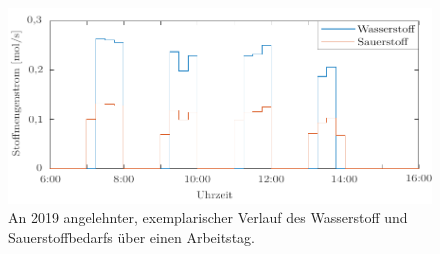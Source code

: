 \begin{figure}[h]
	\centering
		\includegraphics[scale=1]{Figures/Datensatz2molar}
		\caption{An 2019 angelehnter, exemplarischer Verlauf des Wasserstoff und Sauerstoffbedarfs über einen Arbeitstag.}		
\label{fig:Daten2}	
\end{figure}